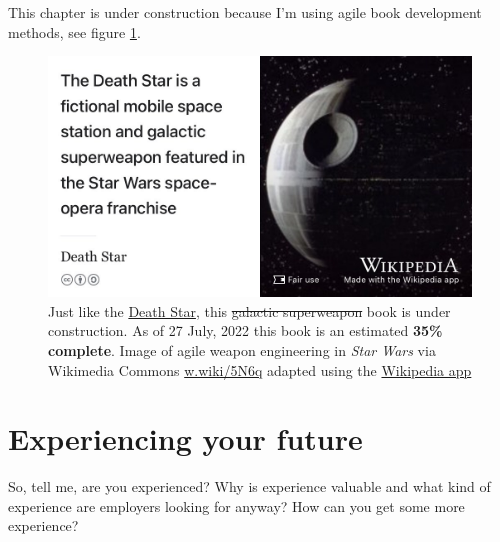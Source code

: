 \documentclass[
]{book}
\begin{document}
This chapter is under construction because I'm using agile book development methods, see figure \ref{fig:deathstar-fig}.

\begin{figure}

{\centering \includegraphics[width=0.99\linewidth]{images/DeathStar2} 

}

\caption{Just like the \href{https://en.wikipedia.org/wiki/Death_Star}{Death Star}, this \sout{galactic superweapon} book is under construction. As of 27 July, 2022 this book is an estimated \textbf{35\% complete}. Image of agile weapon engineering in \emph{Star Wars} via Wikimedia Commons \href{https://w.wiki/5N6q}{w.wiki/5N6q} adapted using the \href{https://apps.apple.com/gb/app/wikipedia/id324715238}{Wikipedia app}}\label{fig:deathstar-fig}
\end{figure}



\hypertarget{experiencing}{%
\chapter{Experiencing your future}\label{experiencing}}

So, tell me, are you experienced? Why is experience valuable and what kind of experience are employers looking for anyway? How can you get some more experience? 🤔
\end{document}
